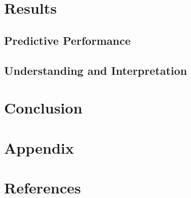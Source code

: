 \documentclass[12pt, letterpaper]{article}
\begin{document}

\section{Results} %


\subsection{Predictive Performance} %


\subsection{Understanding and Interpretation} %


\section{Conclusion} %


\section{Appendix}


\section{References}
\end{document}
